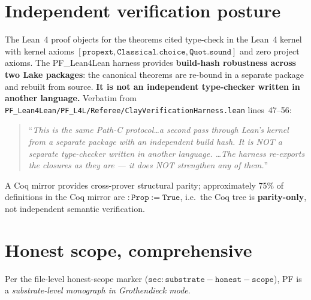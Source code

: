 \documentclass[11pt,a4paper]{article}
\theoremstyle{plain}
\theoremstyle{definition}
\begin{document}
\section{Independent verification posture}
\label{sec:l4l}

The Lean~4 proof objects for the theorems cited type-check in the
Lean~4 kernel with kernel axioms $\mathtt{[propext, Classical.choice,
Quot.sound]}$ and zero project axioms. The PF\_Lean4Lean harness
provides \textbf{build-hash robustness across two Lake packages}:
the canonical theorems are re-bound in a separate package and
rebuilt from source. \textbf{It is not an independent type-checker
written in another language.} Verbatim from
\texttt{PF\_Lean4Lean/PF\_L4L/Referee/ClayVerificationHarness.lean}
lines~47--56:
\begin{quote}
``\emph{This is the same Path-C protocol\ldots a second pass through
Lean's kernel from a separate package with an independent build
hash. It is NOT a separate type-checker written in another language.
\ldots The harness re-exports the closures as they are --- it does NOT
strengthen any of them.}''
\end{quote}
A Coq mirror provides cross-prover structural parity; approximately
75\% of definitions in the Coq mirror are $\mathtt{: Prop := True}$,
i.e.\ the Coq tree is \textbf{parity-only}, not independent semantic
verification.

\section{Honest scope, comprehensive}
\label{sec:honest-scope}

Per the file-level honest-scope marker
($\mathtt{sec:substrate-honest-scope}$), PF is a
\emph{substrate-level monograph in Grothendieck mode}.
\end{document}
